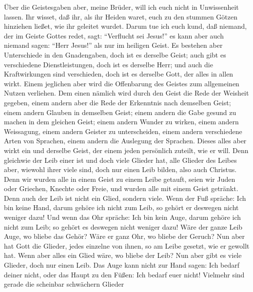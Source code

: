  Über die Geistesgaben aber, meine Brüder, will ich euch
nicht in Unwissenheit lassen.  Ihr wisset, daß ihr, als
ihr Heiden waret, euch zu den stummen Götzen hinziehen ließet, wie ihr
geleitet wurdet.  Darum tue ich euch kund, daß niemand,
der im Geiste Gottes redet, sagt: ``Verflucht sei Jesus!'' es kann aber
auch niemand sagen: ``Herr Jesus!'' als nur im heiligen Geist.
 Es bestehen aber Unterschiede in den Gnadengaben, doch
ist es derselbe Geist;  auch gibt es verschiedene
Dienstleistungen, doch ist es derselbe Herr;  und auch die
Kraftwirkungen sind verschieden, doch ist es derselbe Gott, der alles in
allen wirkt.  Einem jeglichen aber wird die Offenbarung
des Geistes zum allgemeinen Nutzen verliehen.  Dem einen
nämlich wird durch den Geist die Rede der Weisheit gegeben, einem andern
aber die Rede der Erkenntnis nach demselben Geist;  einem
andern Glauben in demselben Geist; einem andern die Gabe gesund zu
machen in dem gleichen Geist;  einem andern Wunder zu
wirken, einem andern Weissagung, einem andern Geister zu unterscheiden,
einem andern verschiedene Arten von Sprachen, einem andern die Auslegung
der Sprachen.  Dieses alles aber wirkt ein und derselbe
Geist, der einem jeden persönlich zuteilt, wie er will. 
Denn gleichwie der Leib einer ist und doch viele Glieder hat, alle
Glieder des Leibes aber, wiewohl ihrer viele sind, doch nur einen Leib
bilden, also auch Christus.  Denn wir wurden alle in
einem Geist zu einem Leibe getauft, seien wir Juden oder Griechen,
Knechte oder Freie, und wurden alle mit einem Geist getränkt.
 Denn auch der Leib ist nicht ein Glied, sondern viele.
 Wenn der Fuß spräche: Ich bin keine Hand, darum gehöre
ich nicht zum Leib, so gehört er deswegen nicht weniger dazu!
 Und wenn das Ohr spräche: Ich bin kein Auge, darum
gehöre ich nicht zum Leib; so gehört es deswegen nicht weniger dazu!
 Wäre der ganze Leib Auge, wo bliebe das Gehör? Wäre er
ganz Ohr, wo bliebe der Geruch?  Nun aber hat Gott die
Glieder, jedes einzelne von ihnen, so am Leibe gesetzt, wie er gewollt
hat.  Wenn aber alles ein Glied wäre, wo bliebe der Leib?
 Nun aber gibt es viele Glieder, doch nur einen Leib.
 Das Auge kann nicht zur Hand sagen: Ich bedarf deiner
nicht, oder das Haupt zu den Füßen: Ich bedarf euer nicht!
 Vielmehr sind gerade die scheinbar schwächern Glieder
